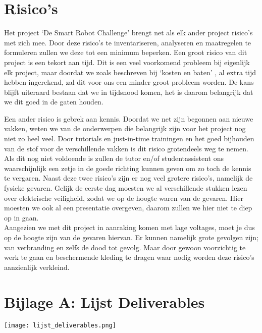 \documentclass[11pt]{article}
\begin{document}
\section{Risico's}
Het project ‘De Smart Robot Challenge’  brengt net als elk ander project risico’s met zich mee. Door deze risico’s te inventariseren, analyseren en maatregelen te formuleren zullen we deze tot een minimum beperken. 
\indent Een groot risico van dit project is een tekort aan tijd. Dit is een veel voorkomend probleem bij eigenlijk elk project, maar doordat we zoals beschreven bij ‘kosten en baten’ , al extra tijd hebben ingerekend, zal dit voor ons een minder groot probleem worden. De kans blijft uiteraard bestaan dat we in tijdsnood komen, het is daarom belangrijk dat we dit goed in de gaten houden. 

\indent Een ander risico is gebrek aan kennis. Doordat we net zijn begonnen aan nieuwe vakken, weten we van de onderwerpen die belangrijk zijn voor het project nog niet zo heel veel. Door tutorials en just-in-time trainingen en het goed bijhouden van de stof voor de verschillende vakken is dit risico grotendeels weg te nemen. Als dit nog niet voldoende is zullen de tutor en/of studentassistent ons waarschijnlijk een zetje in de goede richting kunnen geven om zo toch de kennis te vergaren.
\indent Naast deze twee risico’s zijn er nog veel grotere risico’s, namelijk de fysieke gevaren.
Gelijk de eerste dag moesten we al verschillende stukken lezen over elektrische veiligheid, zodat we op de hoogte waren van de gevaren. Hier moesten we ook al een presentatie overgeven, daarom zullen we hier niet te diep op in gaan.\\
\indent Aangezien we met dit project in aanraking komen met lage voltages, moet je dus op de hoogte zijn van de gevaren hiervan. Er kunnen namelijk grote gevolgen zijn; van verbranding en zelfs de dood tot gevolg. Maar door gewoon voorzichtig te werk te gaan en beschermende kleding te dragen waar nodig worden deze risico’s aanzienlijk verkleind.

\newpage
\section{Bijlage A: Lijst Deliverables}
\texttt{[image: lijst\_deliverables.png]}
\end{document}
